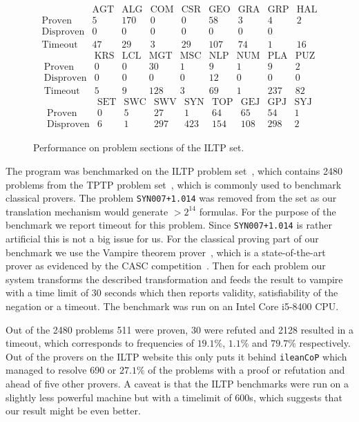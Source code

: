 \documentclass[a4paper,11pt]{report}
\theoremstyle{definition}
\theoremstyle{definition}
\theoremstyle{definition}
\theoremstyle{definition}
\theoremstyle{definition}
\theoremstyle{definition}
\theoremstyle{definition}
\begin{document}
	\begin{figure}[h]\label{results}
		$$\begin{matrix}
			&\text{AGT}&\text{ALG}&\text{COM}&\text{CSR}&\text{GEO}&\text{GRA}&\text{GRP}&\text{HAL}\\
			\text{Proven}&5&170&0&0&58&3&4&2\\
			\text{Disproven}&0&0&0&0&0&0&0&\\
			\text{Timeout}&47&29&3&29&107&74&1&16
		\end{matrix}$$
		$$\begin{matrix}
			&\text{KRS}&\text{LCL}&\text{MGT}&\text{MSC}&\text{NLP}&\text{NUM}&\text{PLA}&\text{PUZ}\\
			\text{Proven}&0&0&30&1&9&1&9&2\\
			\text{Disproven}&0&0&0&0&12&0&0&0\\
			\text{Timeout}&5&9&128&3&69&1&237&82
		\end{matrix}$$
		$$\begin{matrix}
			&\text{SET}&\text{SWC}&\text{SWV}&\text{SYN}&\text{TOP}&\text{GEJ}&\text{GPJ}&\text{SYJ}\\
			\text{Proven}&0&5&27&1&64&65&54&1\\
			\text{Disproven}&6&1&297&423&154&108&298&2
		\end{matrix}$$
		\caption{Performance on problem sections of the ILTP set.}
	\end{figure}
	
	The program was benchmarked on the ILTP problem set~\cite{iltp}, which contains 2480 problems from the TPTP problem set~\cite{tptp}, which is commonly used to benchmark classical provers. The problem \lstinline|SYN007+1.014| was removed from the set as our translation mechanism would generate $>2^{14}$ formulas. For the purpose of the benchmark we report timeout for this problem. Since \lstinline|SYN007+1.014| is rather artificial this is not a big issue for us. For the classical proving part of our benchmark we use the Vampire theorem prover~\cite{Kov_cs_2013}, which is a state-of-the-art prover as evidenced by the CASC competition~\cite{casc}. Then for each problem our system transforms the described transformation and feeds the result to vampire with a time limit of 30 seconds which then reports validity, satisfiability of the negation or a timeout. The benchmark was run on an Intel Core i5-8400 CPU.

	Out of the 2480 problems 511 were proven, 30 were refuted and 2128 resulted in a timeout, which corresponds to frequencies of $19.1\%$, $1.1\%$ and $79.7\%$ respectively. Out of the provers on the ILTP website this only puts it behind \lstinline|ileanCoP| which managed to resolve 690 or $27.1\%$ of the problems with a proof or refutation and ahead of  five other provers. A caveat is that the ILTP benchmarks were run on a slightly less powerful machine but with a timelimit of 600s, which suggests that our result might be even better.
	
\end{document}
